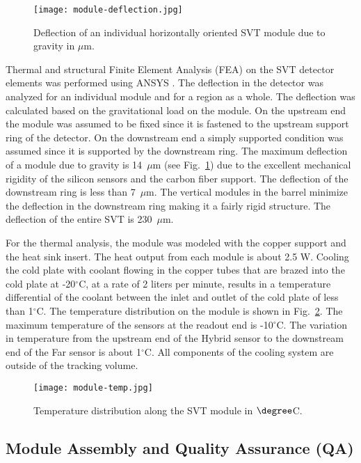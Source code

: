 \begin{figure}[hbt] 
\centering 
\texttt{[image: module-deflection.jpg]}
\caption{Deflection of an individual horizontally oriented SVT module due to gravity in $\mu$m.}
\label{fig:module-deflection}
\end{figure}

Thermal and structural Finite Element Analysis (FEA) on the SVT detector elements was performed using ANSYS \cite{ANSYS}. The deflection in the detector was analyzed for an individual module and for a region as a whole. The deflection was calculated based on the gravitational load on the module. On the upstream end the module was assumed to be fixed since it is fastened to the upstream support ring of the detector. On the downstream end a simply supported condition was assumed since it is supported by the downstream ring. The maximum deflection of a module due to gravity is 14~$\mu$m (see Fig.~\ref{fig:module-deflection}) due to the excellent mechanical rigidity of the silicon sensors and the carbon fiber support. The deflection of the downstream ring is less than 7~$\mu$m. The vertical modules in the barrel minimize the deflection in the downstream ring making it a fairly rigid structure. The deflection of the entire SVT is 230~$\mu$m. 

For the thermal analysis, the module was modeled with the copper support and the heat sink insert. The heat output from each module is about 2.5 W. Cooling the cold plate with coolant flowing in the copper tubes that are brazed into the cold plate at -20$^\circ$C, at a rate of 2 liters per minute, results in a temperature differential of the coolant between the inlet and outlet of the cold plate of less than 1$^\circ$C. The temperature distribution on the module is shown in Fig.~\ref{fig:module-temp}. The maximum temperature of the sensors at the readout end is -10$^\circ$C. The variation in temperature from the upstream end of the Hybrid sensor to the downstream end of the Far sensor is about 1$^\circ$C. All components of the cooling system are outside of the tracking volume.

\begin{figure}[hbt] 
\centering 
\texttt{[image: module-temp.jpg]}
\caption{Temperature distribution along the SVT module in $\degree$C.}
\label{fig:module-temp}
\end{figure}

\subsection{Module Assembly and Quality Assurance (QA)}

